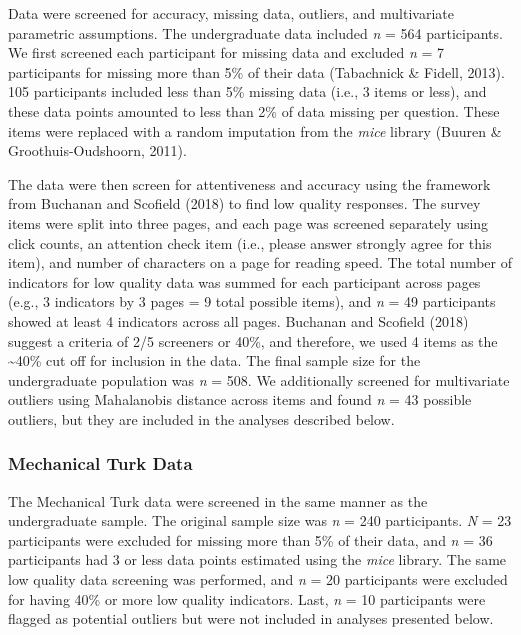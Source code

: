\documentclass[
  english,
  man]{apa6}
\begin{document}
Data were screened for accuracy, missing data, outliers, and
multivariate parametric assumptions. The undergraduate data included \emph{n}
= 564 participants. We first screened each participant for
missing data and excluded \emph{n} = 7
participants for missing more than 5\% of their data (Tabachnick \& Fidell, 2013).
105 participants included less
than 5\% missing data (i.e., 3 items or less), and these data points
amounted to less than 2\% of data missing per question. These items were
replaced with a random imputation from the \emph{mice} library (Buuren \& Groothuis-Oudshoorn, 2011).

The data were then screen for attentiveness and accuracy using the
framework from Buchanan and Scofield (2018) to find low quality responses. The survey
items were split into three pages, and each page was screened separately
using click counts, an attention check item (i.e., please answer
strongly agree for this item), and number of characters on a page for
reading speed. The total number of indicators for low quality data was
summed for each participant across pages (e.g., 3 indicators by 3 pages
= 9 total possible items), and \emph{n} =
49 participants showed at least 4
indicators across all pages. Buchanan and Scofield (2018) suggest a criteria of 2/5
screeners or 40\%, and therefore, we used 4 items as the \textasciitilde40\% cut off
for inclusion in the data. The final sample size for the undergraduate
population was \emph{n} = 508. We additionally screened for
multivariate outliers using Mahalanobis distance across items and found
\emph{n} = 43 possible outliers, but they
are included in the analyses described below.

\subsubsection{Mechanical Turk Data}\label{mechanical-turk-data}

The Mechanical Turk data were screened in the same manner as the
undergraduate sample. The original sample size was \emph{n} = 240
participants. \emph{N} = 23 participants
were excluded for missing more than 5\% of their data, and \emph{n} =
36 participants had 3 or less
data points estimated using the \emph{mice} library. The same low quality
data screening was performed, and \emph{n} =
20 participants were excluded
for having 40\% or more low quality indicators. Last, \emph{n} =
10 participants were flagged as
potential outliers but were not included in analyses presented below.
\end{document}
